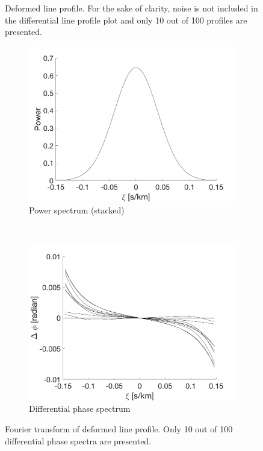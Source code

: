 \begin{figure}[tbp]
    \caption[Deformed line profile]{Deformed line profile. For the sake of clarity, noise is not included in  
    the differential line profile plot and only 10 out of 100 profiles are presented.}
\label{fig:line_profiles_deformation}
\end{figure}	

\begin{figure}[tbp]	
    \begin{subfigure}[b]{0.49\textwidth}
        \includegraphics[width=\textwidth]{./Figures/Methods/LPD2-FT_power.png}
        \caption{Power spectrum (stacked)}
    \end{subfigure}
	~
    \begin{subfigure}[b]{0.49\textwidth}
        \includegraphics[width=\textwidth]{./Figures/Methods/LPD4-Relative_phase_angle.png}
        \caption{Differential phase spectrum}
        \label{fig:dps_LPD}
    \end{subfigure}	
    
    \caption[Fourier transform of deformed line profile]
    {Fourier transform of deformed line profile. Only 10 out of 100 differential phase spectra are presented.}
\label{fig:FT_process_LPD}
\end{figure}    


